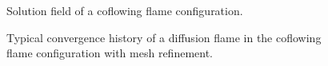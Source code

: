 \begin{figure}[t]
	\centering
	\pgfplotsset{width=0.6\textwidth, compat=1.3}
	\par\bigskip
	\caption{Solution field of a coflowing flame configuration.} \label{fig:CoFlowFlameFig}
\end{figure}
\begin{figure}[t!]
	\centering
	\caption{Typical convergence history of a diffusion flame in the coflowing flame configuration with mesh refinement.}
	\label{fig:CoFlow_ConvergenceStory}
\end{figure}
\FloatBarrier